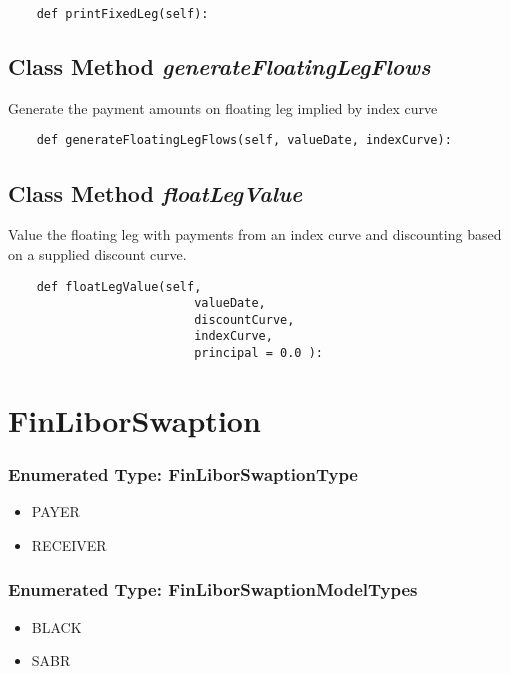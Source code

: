 \documentclass[twoside,11pt]{book}
\begin{document}
\begin{lstlisting}
    def printFixedLeg(self):
\end{lstlisting}

\subsection{Class Method {\it generateFloatingLegFlows}}
Generate the payment amounts on floating leg implied by index curve 

\begin{lstlisting}
    def generateFloatingLegFlows(self, valueDate, indexCurve):
\end{lstlisting}

\subsection{Class Method {\it floatLegValue}}
Value the floating leg with payments from an index curve and discounting based on a supplied discount curve. 

\begin{lstlisting}
    def floatLegValue(self, 
                          valueDate, 
                          discountCurve, 
                          indexCurve, 
                          principal = 0.0 ):
\end{lstlisting}

\newpage
\section{FinLiborSwaption}

\subsubsection{Enumerated Type: FinLiborSwaptionType}
\begin{itemize}
\item{PAYER}
\item{RECEIVER}
\end{itemize}

\subsubsection{Enumerated Type: FinLiborSwaptionModelTypes}
\begin{itemize}
\item{BLACK}
\item{SABR}
\end{itemize}
\end{document}
